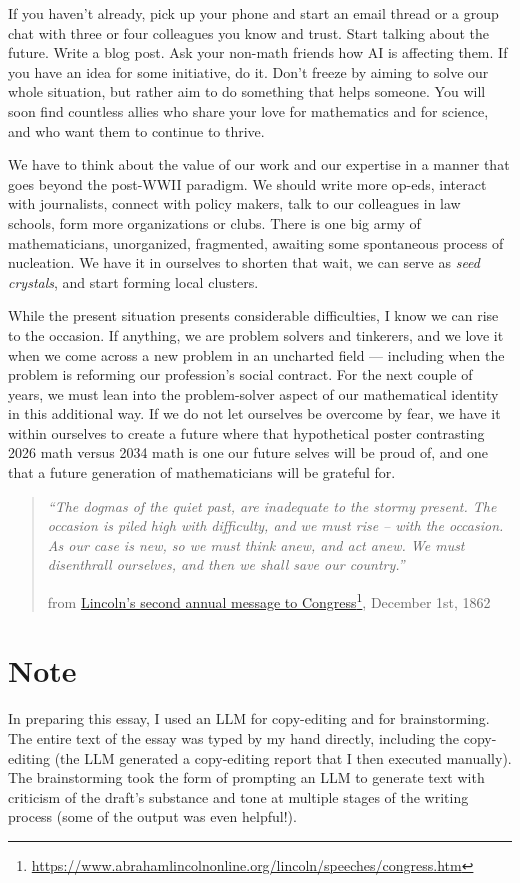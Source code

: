\documentclass[11pt]{amsart}
\begin{document}
If you haven't already, pick up your phone and start an email thread or a group chat with three or four colleagues you know and trust. Start talking about the future. Write a blog post. Ask your non-math friends how AI is affecting them. If you have an idea for some initiative, do it. Don't freeze by aiming to solve our whole situation, but rather aim to do something that helps someone. You will soon find countless allies who share your love for mathematics and for science, and who want them to continue to thrive.

We have to think about the value of our work and our expertise in a manner that goes beyond the post-WWII paradigm. We should write more op-eds, interact with journalists, connect with policy makers, talk to our colleagues in law schools, form more organizations or clubs. There is one big army of mathematicians, unorganized, fragmented, awaiting some spontaneous process of nucleation. We have it in ourselves to shorten that wait, we can serve as \emph{seed crystals}, and start forming local clusters.

While the present situation presents considerable difficulties, I know we can rise to the occasion. If anything, we are problem solvers and tinkerers, and we love it when we come across a new problem in an uncharted field --- including when the problem is reforming our profession's social contract. For the next couple of years, we must lean into the problem-solver aspect of our mathematical identity in this additional way. If we do not let ourselves be overcome by fear, we have it within ourselves to create a future where that hypothetical poster contrasting 2026 math versus 2034 math is one our future selves will be proud of, and one that a future generation of mathematicians will be grateful for.

\begin{quote}\itshape ``The dogmas of the quiet past, are inadequate to the stormy present. The occasion is piled high with difficulty, and we must rise -- with the occasion. As our case is new, so we must think anew, and act anew. We must disenthrall ourselves, and then we shall save our country.''\par\medskip\normalfont\small\raggedleft from \href{https://www.abrahamlincolnonline.org/lincoln/speeches/congress.htm}{Lincoln's second annual message to Congress}\footnote{\url{https://www.abrahamlincolnonline.org/lincoln/speeches/congress.htm}}, December 1st, 1862\par\end{quote}

\section{Note}
In preparing this essay, I used an LLM for copy-editing and for brainstorming. The entire text of the essay was typed by my hand directly, including the copy-editing (the LLM generated a copy-editing report that I then executed manually). The brainstorming took the form of prompting an LLM to generate text with criticism of the draft's substance and tone at multiple stages of the writing process (some of the output was even helpful!).
\end{document}
